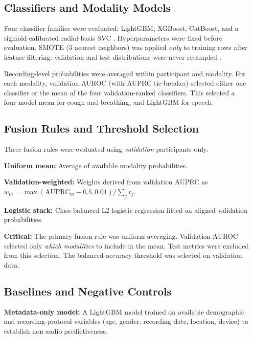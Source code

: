 \documentclass[conference]{IEEEtran}
\begin{document}
\subsection{Classifiers and Modality Models}

Four classifier families were evaluated: LightGBM, XGBoost, CatBoost, and a sigmoid-calibrated radial-basis SVC \cite{ke2017lightgbm,chen2016xgboost,prokhorenkova2018catboost,cortes1995svm}. Hyperparameters were fixed before evaluation. SMOTE (3 nearest neighbors) was applied \emph{only} to training rows after feature filtering; validation and test distributions were never resampled \cite{chawla2002smote}.

Recording-level probabilities were averaged within participant and modality. For each modality, validation AUROC (with AUPRC tie-breaker) selected either one classifier or the mean of the four validation-ranked classifiers. This selected a four-model mean for cough and breathing, and LightGBM for speech.

\subsection{Fusion Rules and Threshold Selection}

Three fusion rules were evaluated using \emph{validation} participants only:

\textbf{Uniform mean:} Average of available modality probabilities.

\textbf{Validation-weighted:} Weights derived from validation AUPRC as $w_m = \max(\mathrm{AUPRC}_m - 0.5, 0.01) / \sum_j r_j$.

\textbf{Logistic stack:} Class-balanced L2 logistic regression fitted on aligned validation probabilities.

\textbf{Critical:} The primary fusion rule was uniform averaging. Validation AUROC selected only \emph{which modalities} to include in the mean. Test metrics were excluded from this selection. The balanced-accuracy threshold was selected on validation data.

\subsection{Baselines and Negative Controls}

\textbf{Metadata-only model:} A LightGBM model trained on available demographic and recording-protocol variables (age, gender, recording date, location, device) to establish non-audio predictiveness.
\end{document}
